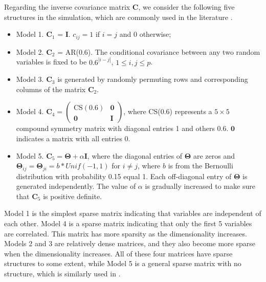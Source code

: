 \documentclass[12pt]{article}
\begin{document}
Regarding the inverse covariance matrix $\bm C$, we consider the following five structures in the simulation, which are commonly used in the literature \citep{yuan2007model, kang2020variable}.
\begin{itemize}
\item Model 1. $\bm C_1$ = $\bm I$. $c_{ij}=1$ if $i=j$ and 0 otherwise;

\item Model 2. $\bm C_2$ = AR(0.6). The conditional covariance between any two random variables is fixed to be $0.6^{|i - j|}$, $1 \leq i, j \leq p$.

\item Model 3. $\bm C_3$ is generated by randomly permuting rows and corresponding columns of the matrix $\bm C_2$.

\item Model 4. $\bm C_4 = \left(
\begin{array}{cc}
    \mbox{CS}(0.6) & \bm 0 \\
    \bm 0 &  \bm I
  \end{array}
\right)$, where CS(0.6) represents a $5 \times 5$ compound symmetry matrix with diagonal entries 1 and others 0.6.
$\bm 0$ indicates a matrix with all entries 0.

\item Model 5. $\bm C_{5} = \bm \Theta + \alpha \bm I$, where the diagonal entries of $\bm \Theta$ are zeros and $\bm \Theta_{ij} = \bm \Theta_{ji} = b * Unif(-1, 1)$ for $i \neq j$, where $b$ is from the Bernoulli distribution with probability 0.15 equal 1. Each off-diagonal entry of $\bm \Theta$ is generated independently.
The value of $\alpha$ is gradually increased to make sure that $\bm C_{5}$ is positive definite.
\end{itemize}
Model 1 is the simplest sparse matrix indicating that variables are independent of each other.
Model 4 is a sparse matrix indicating that only the first 5 variables are correlated.
This matrix has more sparsity as the dimensionality increases.
Models 2 and 3 are relatively dense matrices, and they also become more sparse when the dimensionality increases.
All of these four matrices have sparse structures to some extent,
while Model 5 is a general sparse matrix with no structure, which is similarly used in \cite{bien2011sparse}.
\end{document}
